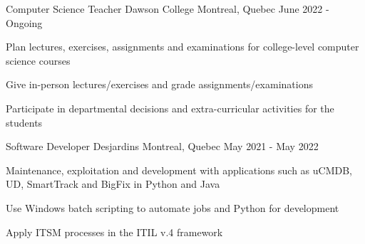

\begin{cventries}

  
  \cventry
    {Computer Science Teacher} %
    {Dawson College} %
    {Montreal, Quebec} %
    {June 2022 - Ongoing} %
    {
      \begin{cvitems} %
        \item {Plan lectures, exercises, assignments and examinations for college-level computer science courses}
        \item {Give in-person lectures/exercises and grade assignments/examinations}
        \item {Participate in departmental decisions and extra-curricular activities for the students}
      \end{cvitems}
    }
  
  \cventry
    {Software Developer} %
    {Desjardins} %
    {Montreal, Quebec} %
    {May 2021 - May 2022} %
    {
      \begin{cvitems} %
        \item {Maintenance, exploitation and development with applications such as uCMDB, UD, SmartTrack and BigFix in Python and Java}
        \item {Use Windows batch scripting to automate jobs and Python for development}
        \item {Apply ITSM processes in the ITIL v.4 framework}
      \end{cvitems}
    }
    

\end{cventries}
